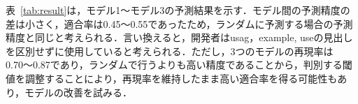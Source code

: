 \documentclass[uplatex,dvipdfmx,a4paper,twocolumn,base=11pt,jbase=11pt,ja=standard]{bxjsarticle}  %
\newcommand{\todo}[1]{\colorbox{yellow}{{\bf TODO}:}{\color{red} {\textbf{[#1]}}}}
\begin{document}


表~\ref{tab:result}は，モデル1〜モデル3の予測結果を示す．モデル間の予測精度の差は小さく，適合率は0.45〜0.55であったため，ランダムに予測する場合の予測精度と同じと考えられる．言い換えると，開発者はusag，example, useの見出しを区別せずに使用していると考えられる．ただし，3つのモデルの再現率は0.70〜0.87であり，ランダムで行うよりも高い精度であることから，判別する閾値を調整することにより，再現率を維持したまま高い適合率を得る可能性もあり，モデルの改善を試みる．

\end{document}
